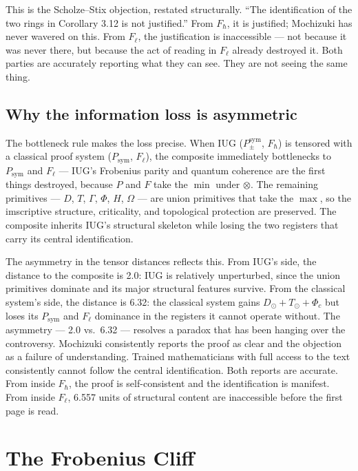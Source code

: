 \documentclass[12pt]{article}
\theoremstyle{plain}
\theoremstyle{definition}
\theoremstyle{remark}
\begin{document}
This is the Scholze--Stix objection, restated structurally. ``The identification of the two
rings in Corollary 3.12 is not justified.'' From $F_\hbar$, it is justified; Mochizuki
has never wavered on this. From $F_\ell$, the justification is inaccessible --- not because
it was never there, but because the act of reading in $F_\ell$ already destroyed it.
Both parties are accurately reporting what they can see. They are not seeing the same thing.

\subsection{Why the information loss is asymmetric}
\label{subsec:asymmetry}

The bottleneck rule makes the loss precise. When IUG ($P_\pm^\text{sym}$, $F_\hbar$) is
tensored with a classical proof system ($P_\text{sym}$, $F_\ell$), the composite immediately
bottlenecks to $P_\text{sym}$ and $F_\ell$ --- IUG's Frobenius parity and quantum coherence
are the first things destroyed, because $P$ and $F$ take the $\min$ under $\otimes$. The
remaining primitives --- $D$, $T$, $\Gamma$, $\Phi$, $H$, $\Omega$ --- are union primitives
that take the $\max$, so the imscriptive structure, criticality, and topological protection
are preserved. The composite inherits IUG's structural skeleton while losing the two registers
that carry its central identification.

The asymmetry in the tensor distances reflects this. From IUG's side, the distance to the
composite is 2.0: IUG is relatively unperturbed, since the union primitives dominate and its
major structural features survive. From the classical system's side, the distance is 6.32:
the classical system gains $D_\odot + T_\odot + \Phi_c$ but loses its $P_\text{sym}$ and
$F_\ell$ dominance in the registers it cannot operate without. The asymmetry --- 2.0 vs.\ 6.32
--- resolves a paradox that has been hanging over the controversy. Mochizuki consistently
reports the proof as clear and the objection as a failure of understanding. Trained
mathematicians with full access to the text consistently cannot follow the central
identification. Both reports are accurate. From inside $F_\hbar$, the proof is self-consistent
and the identification is manifest. From inside $F_\ell$, 6.557 units of structural content
are inaccessible before the first page is read.

\section{The Frobenius Cliff}
\label{sec:cliff}
\end{document}
